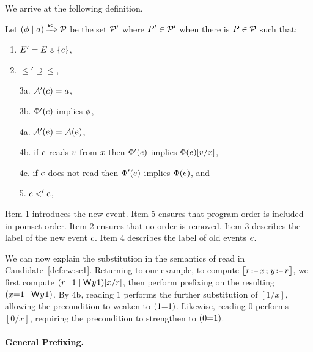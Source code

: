 We arrive at the following definition.
\begin{definition}
  \label{def:pre-sc}
Let $(\phi \mid a) \mathbin{\smash{\xRightarrow{\mathsf{sc}}}} \mathcal{P}$ be the set $\mathcal{P}'$ where $P'\in\mathcal{P}'$ when
there is $P\in\mathcal{P}$ such that:
\begin{enumerate}
\item\label{pre-E} $E' = E \uplus \{c\}$,
\item\label{pre-le} ${\le'}\supseteq{\le}$, %
\item[3a.] $\mathcal{A}'(c) = a$,
\item[3b.] $\Phi'(c)$ implies $\phi$,
\item[4a.] $\mathcal{A}'(e) = \mathcal{A}(e)$,
\item[4b.] if $c$ \externally reads $v$ from $x$ then
  $\Phi'(e)$ implies $\Phi(e)[v/x]$,
\item[4c.] if $c$ does not \externally read then
  $\Phi'(e)$ implies $\Phi(e)$, and
\item[5.] $c <' e$, 
\end{enumerate}
\end{definition}
Item 1 introduces the new event.  Item 5 ensures that program order is included in
pomset order.  Item 2 ensures that no order is removed.  Item 3 describes the
label of the new event $c$.  Item 4 describes the label of old events
$e$.

We can now explain the substitution in the semantics of read in Candidate~\ref{def:rw:sc1}.
Returning to our example, to compute
$\llbracket r\texttt{:}\mkern-1mu\texttt{=}\, x\texttt{;}\,\allowbreak y\texttt{:}\mkern-1mu\texttt{=}\, r\rrbracket$, we first compute
$(r\EQ1\mid\DW{y}{1})[x/r]$, then perform prefixing on the resulting $(x\EQ1\mid\DW{y}{1})$.  By 4b, reading $1$
performs the further substitution of $[1/x]$, allowing the precondition to
weaken to $(1{=}1)$.  Likewise, reading $0$ performs $[0/x]$, requiring the precondition
to strengthen to $(0{=}1)$.

\paragraph{General Prefixing.}

